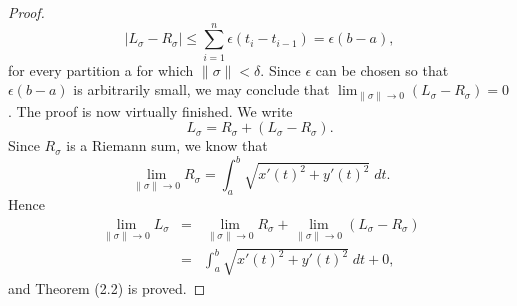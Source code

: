 \begin{proof}
$$
|L_\sigma - R_\sigma|  \leq \sum_{i=1}^n \epsilon(t_i - t_{i-1}) = \epsilon (b - a),
$$
for every partition a for which $\parallel \sigma \parallel < \delta$. Since $\epsilon$ can be chosen so that $\epsilon (b - a)$ is arbitrarily small, we may conclude that $\lim_{\parallel \sigma \parallel \rightarrow 0} (L_\sigma - R_\sigma) = 0$. The proof is now virtually finished. We write 
$$
L_\sigma = R_\sigma + (L_\sigma - R_\sigma).
$$
Since $R_\sigma$ is a Riemann sum, we know that
$$
\lim_{\parallel \sigma \parallel \rightarrow 0} R_\sigma = \int_a^b \sqrt {x'(t)^2 + y'(t)^2} \;dt.
$$
Hence 
\begin{eqnarray*}
\lim_{\parallel \sigma \parallel \rightarrow 0} L_\sigma 
&=& \lim_{\parallel \sigma \parallel \rightarrow 0} R_\sigma + \lim_{\parallel \sigma \parallel \rightarrow 0} (L_\sigma - R_\sigma) \\
&=& \int_a^b \sqrt{x'(t)^2 + y'(t)^2} \;dt + 0,
\end{eqnarray*}
and Theorem (2.2) is proved.
\end{proof}


